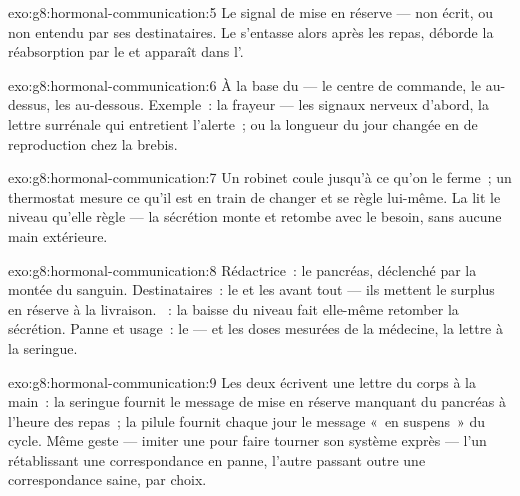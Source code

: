 \begin{solution}{exo:g8:hormonal-communication:5}
Le signal de mise en réserve --- non écrit, ou non entendu
par ses destinataires. Le  s'entasse alors après les
repas, déborde la réabsorption par le  et apparaît dans
l'.
\end{solution}

\begin{solution}{exo:g8:hormonal-communication:6}
À la base du  --- le centre de commande, le  au-dessus, les  au-dessous. Exemple~: la
frayeur --- les signaux nerveux d'abord, la lettre surrénale
qui entretient l'alerte~; ou la longueur du jour changée en
 de reproduction chez la brebis.
\end{solution}

\begin{solution}{exo:g8:hormonal-communication:7}
Un robinet coule jusqu'à ce qu'on le ferme~; un thermostat
mesure ce qu'il est en train de changer et se règle
lui-même. La  lit le niveau qu'elle règle --- la
sécrétion monte et retombe avec le besoin, sans aucune main
extérieure.
\end{solution}

\begin{solution}{exo:g8:hormonal-communication:8}
Rédactrice~: le pancréas, déclenché par la montée du 
sanguin. Destinataires~: le  et les  avant tout
--- ils mettent le surplus en réserve à la livraison.
~: la baisse du niveau fait elle-même retomber
la sécrétion. Panne et usage~: le  --- et les doses
mesurées de la médecine, la lettre à la seringue.
\end{solution}

\begin{solution}{exo:g8:hormonal-communication:9}
Les deux écrivent une lettre du corps à la main~: la
seringue fournit le message de mise en réserve manquant du
pancréas à l'heure des repas~; la pilule fournit chaque jour
le message «~en suspens~» du cycle. Même geste --- imiter
une  pour faire tourner son système exprès --- l'un
rétablissant une correspondance en panne, l'autre passant
outre une correspondance saine, par choix.
\end{solution}

